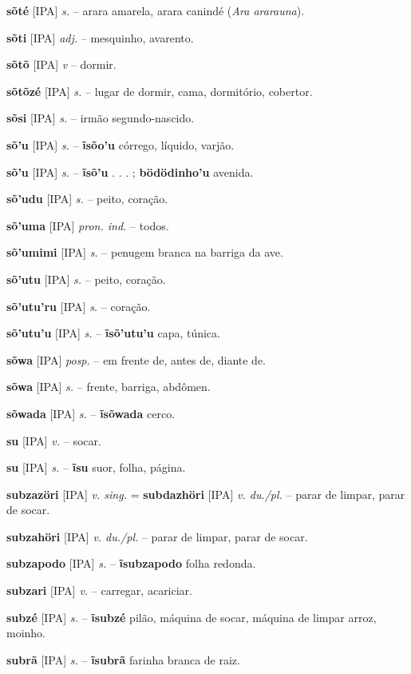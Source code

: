 \textbf{sõté} [IPA] \textit{s.} -- arara amarela, arara canindé (\textit{Ara ararauna}).

\textbf{sõti} [IPA] \textit{adj.} -- mesquinho, avarento.

\textbf{sõtõ} [IPA] \textit{v} -- dormir.

\textbf{sõtõzé} [IPA] \textit{s.} -- lugar de dormir, cama, dormitório, cobertor.

\textbf{sõsi} [IPA] \textit{s.} -- irmão segundo-nascido.

\textbf{sõ'u} [IPA] \textit{s.} -- \textbf{ĩsõo'u} córrego, líquido, varjão.

\textbf{sõ'u} [IPA] \textit{s.} -- \textbf{ĩsõ'u} . . . ; \textbf{bödödinho'u} avenida.

\textbf{sõ'udu} [IPA] \textit{s.} -- peito, coração.

\textbf{sõ'uma} [IPA] \textit{pron. ind.} -- todos.

\textbf{sõ'umimi} [IPA] \textit{s.} -- penugem branca na barriga da ave.

\textbf{sõ'utu} [IPA] \textit{s.} -- peito, coração.

\textbf{sõ'utu'ru} [IPA] \textit{s.} -- coração.

\textbf{sõ'utu'u} [IPA] \textit{s.} -- \textbf{ĩsõ'utu'u} capa, túnica.

\textbf{sõwa} [IPA] \textit{posp.} -- em frente de, antes de, diante de.

\textbf{sõwa} [IPA] \textit{s.} -- frente, barriga, abdômen.

\textbf{sõwada} [IPA] \textit{s.} -- \textbf{ĩsõwada} cerco.

\textbf{su} [IPA] \textit{v.} -- socar.

\textbf{su} [IPA] \textit{s.} -- \textbf{ĩsu} suor, folha, página.

\textbf{subzazöri} [IPA] \textit{v. sing.} = \textbf{subdazhöri} [IPA] \textit{v. du./pl.} -- parar de limpar, parar de socar.

\textbf{subzahöri} [IPA] \textit{v. du./pl.} -- parar de limpar, parar de socar.

\textbf{subzapodo} [IPA] \textit{s.} -- \textbf{ĩsubzapodo} folha redonda.

\textbf{subzari} [IPA] \textit{v.} -- carregar, acariciar.

\textbf{subzé} [IPA] \textit{s.} -- \textbf{ĩsubzé} pilão, máquina de socar, máquina de limpar arroz, moinho.

\textbf{subrã} [IPA] \textit{s.} -- \textbf{ĩsubrã} farinha branca de raiz.

